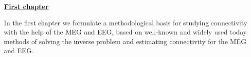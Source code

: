 

\newcommand{\actuality}{\underline{\textbf{\actualityTXTEng}}}
\newcommand{\progress}{\underline{\textbf{\progressTXTEng}}}
\newcommand{\aim}{\underline{{\textbf\aimTXTEng}}}
\newcommand{\tasks}{\underline{\textbf{\tasksTXTEng}}}
\newcommand{\novelty}{\underline{\textbf{\noveltyTXTEng}}}
\newcommand{\influence}{\underline{\textbf{\influenceTXTEng}}}
\newcommand{\methods}{\underline{\textbf{\methodsTXTEng}}}
\newcommand{\defpositions}{\underline{\textbf{\defpositionsTXTEng}}}
\newcommand{\reliability}{\underline{\textbf{\reliabilityTXTEng}}}
\newcommand{\probation}{\underline{\textbf{\probationTXTEng}}}
\newcommand{\contribution}{\underline{\textbf{\contributionTXTEng}}}
\newcommand{\publications}{\underline{\textbf{\publicationsTXTEng}}}






\underline{\textbf{First chapter}}

In the first chapter we formulate a methodological basis for studying
connectivity with the help of the MEG and EEG, based on well-known and widely
used today methods of solving the inverse problem and estimating connectivity
for the MEG and EEG.

